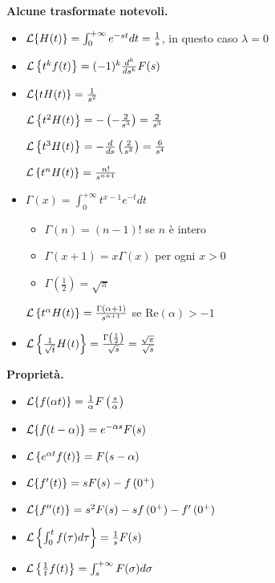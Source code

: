 \textbf{Alcune trasformate notevoli.}
\begin{itemize}
\item $\mathcal{L}\{H( t)\} =\int ^{+\infty }_{0} e^{-st} dt=\frac{1}{s}$, in questo caso $\lambda =0$
\item $\mathcal{L}\left\{t^{k} f( t)\right\} =( -1)^{k}\frac{d^{k}}{ds^{k}} F( s)$
\item $\mathcal{L}\{tH( t)\} =\frac{1}{s^{2}}$

$\mathcal{L}\left\{t^{2} H( t)\right\} =-\left( -\frac{2}{s^{3}}\right) =\frac{2}{s^{3}}$

$\mathcal{L}\left\{t^{3} H( t)\right\} =-\frac{d}{ds}\left(\frac{2}{s^{3}}\right) =\frac{6}{s^{4}}$

$\mathcal{L}\left\{t^{n} H( t)\right\} =\frac{n!}{s^{n+1}}$
\item $\Gamma ( x) =\int ^{+\infty }_{0} t^{x-1} e^{-t} dt$
\begin{itemize}
\item $\Gamma ( n) =( n-1) !$ se $n$ è intero
\item $\Gamma ( x+1) =x\Gamma ( x)$ per ogni $x >0$
\item $\Gamma \left(\frac{1}{2}\right) =\sqrt{\pi }$
\end{itemize}

$\mathcal{L}\left\{t^{\alpha } H( t)\right\} =\frac{\Gamma ( \alpha +1)}{s^{\alpha +1}}$ se $\mathrm{Re}( \alpha )  >-1$
\item $\mathcal{L}\left\{\frac{1}{\sqrt{t}} H( t)\right\} =\frac{\Gamma \left(\frac{1}{2}\right)}{\sqrt{s}} =\frac{\sqrt{\pi }}{\sqrt{s}}$
\end{itemize}

\textbf{Proprietà.}
\begin{itemize}
\item $\mathcal{L}\{f( \alpha t)\} =\frac{1}{\alpha } F\left(\frac{s}{\alpha }\right)$
\item $\mathcal{L}\{f( t-\alpha )\} =e^{-\alpha s} F( s)$
\item $\mathcal{L}\left\{e^{\alpha t} f( t)\right\} =F( s-\alpha )$
\item $\mathcal{L}\{f'( t)\} =sF( s) -f\left( 0^{+}\right)$
\item $\mathcal{L}\{f''( t)\} =s^{2} F( s) -sf\left( 0^{+}\right) -f'\left( 0^{+}\right)$
\item $\mathcal{L}\left\{\int ^{t}_{0} f( \tau ) d\tau \right\} =\frac{1}{s} F( s)$
\item $\mathcal{L}\left\{\frac{1}{t} f( t)\right\} =\int ^{+\infty }_{s} F( \sigma ) d\sigma $
\end{itemize}

